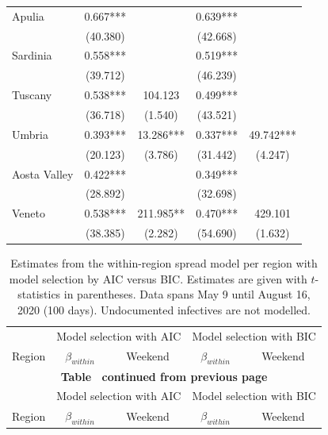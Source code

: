 \documentclass[12pt]{article}
\begin{document}
\begin{appendices}
\begin{longtable}{@{}lcccc@{}}
            Apulia & 0.667*** &  & 0.639*** &  \\ 
             & (40.380) &  & (42.668) &  \\ 
            Sardinia & 0.558*** &  & 0.519*** &  \\ 
             & (39.712) &  & (46.239) &  \\ 
            Tuscany & 0.538*** & 104.123 & 0.499*** &  \\ 
             & (36.718) & (1.540) & (43.521) &  \\ 
            Umbria & 0.393*** & 13.286*** & 0.337*** & 49.742*** \\ 
             & (20.123) & (3.786) & (31.442) & (4.247) \\ 
            Aosta Valley & 0.422*** &  & 0.349*** &  \\ 
             & (28.892) &  & (32.698) &  \\ 
            Veneto & 0.538*** & 211.985** & 0.470*** & 429.101 \\ 
             & (38.385) & (2.282) & (54.690) & (1.632) \\* \bottomrule
    	\end{longtable}
		
		\begin{longtable}{@{}lcccc@{}}
    		\caption{Estimates from the within-region spread model per region with model selection by AIC versus BIC. Estimates are given with $t$-statistics in parentheses. Data spans May 9 until August 16, 2020 (100 days). Undocumented infectives are not modelled.}
    		\label{tab:model_within_aic_vs_bic}\\
    		\toprule
    		                & \multicolumn{2}{c}{Model selection with AIC} & \multicolumn{2}{c}{Model selection with BIC} \\
    		                \cmidrule(lr){2-3}
                            \cmidrule(lr){4-5}
    		Region          & $\beta_{within}$ & Weekend & $\beta_{within}$ & Weekend \\* \midrule
    		\endfirsthead
    		
    		\multicolumn{5}{c}{{\bfseries Table \thetable\ continued from previous page}} \\
    		\toprule
    		                & \multicolumn{2}{c}{Model selection with AIC} & \multicolumn{2}{c}{Model selection with BIC} \\
    		                \cmidrule(lr){2-3}
                            \cmidrule(lr){4-5}
    		Region          & $\beta_{within}$ & Weekend & $\beta_{within}$ & Weekend \\* \midrule
    		\endhead
    		

\end{longtable}
\end{appendices}
\end{document}
